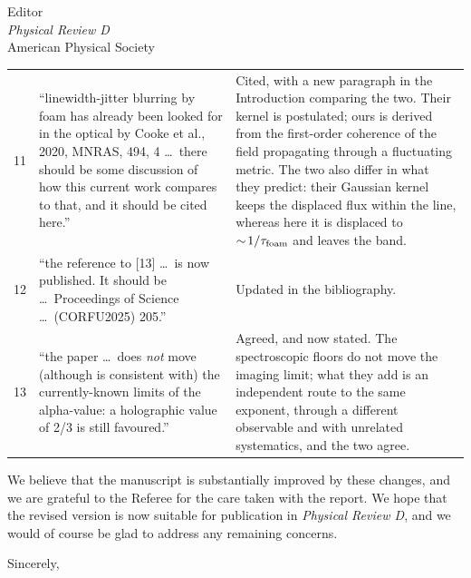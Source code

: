 \documentclass[12pt]{letter}
\begin{document}
\begin{letter}{Editor\\
\textit{Physical Review D}\\
American Physical Society}
\begin{longtable}{@{}p{}p{}p{}@{}}
11 & ``linewidth-jitter blurring by foam has already been looked for in the
optical by Cooke et al., 2020, MNRAS, 494, 4 \ldots\ there should be some
discussion of how this current work compares to that, and it should be cited
here.''
& Cited, with a new paragraph in the Introduction comparing the two.  Their
kernel is postulated; ours is derived from the first-order coherence of the
field propagating through a fluctuating metric.  The two also differ in what
they predict: their Gaussian kernel keeps the displaced flux within the line,
whereas here it is displaced to $\sim\!1/\tau_{\rm foam}$ and leaves the
band. \\[2ex]

12 & ``the reference to [13] \ldots\ is now published.  It should be \ldots\
Proceedings of Science \ldots\ (CORFU2025) 205.''
& Updated in the bibliography. \\[2ex]

13 & ``the paper \ldots\ does \emph{not} move (although is consistent with)
the currently-known limits of the alpha-value: a holographic value of 2/3 is
still favoured.''
& Agreed, and now stated.  The spectroscopic floors do not move the imaging
limit; what they add is an independent route to the same exponent, through a
different observable and with unrelated systematics, and the two agree. \\
\hline
\end{longtable}

\medskip

We believe that the manuscript is substantially improved by these changes,
and we are grateful to the Referee for the care taken with the report.  We
hope that the revised version is now suitable for publication in
\textit{Physical Review D}, and we would of course be glad to address any
remaining concerns.

\closing{Sincerely,}

\end{letter}
\end{document}

